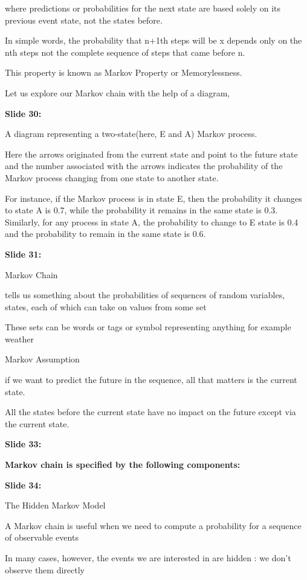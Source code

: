 \documentclass[11pt,a4paper]{article}
\begin{document}
where predictions or probabilities for the next state are based solely on its previous event state, not the states before.

In simple words, the probability that n+1th steps will be x depends only on the nth steps not the complete sequence of steps that came before n.

This property is known as Markov Property or Memorylessness.

Let us explore our Markov chain with the help of a diagram,

\textbf{Slide 30:}

A diagram representing a two-state(here, E and A) Markov process.

Here the arrows originated from the current state and point to the future state and the number associated with the arrows indicates the probability of the Markov process changing from one state to another state.

For instance, if the Markov process is in state E, then the probability it changes to state A is 0.7, while the probability it remains in the same state is 0.3. Similarly, for any process in state A, the probability to change to E state is 0.4 and the probability to remain in the same state is 0.6.

\textbf{Slide 31:}

Markov Chain

tells us something about the probabilities of sequences of random variables, states, each of which can take on values from some set

These sets can be words or tags or symbol representing anything for example weather

Markov Assumption

if we want to predict the future in the sequence, all that matters is the current state.

All the states before the current state have no impact on the future except via the current state.

\textbf{Slide 33:}

\textbf{Markov chain is specified by the following components:} 

\textbf{Slide 34:}

The Hidden Markov Model

A Markov chain is useful when we need to compute a probability for a sequence of observable events

In many cases, however, the events we are interested in are hidden : we don’t observe them directly
\end{document}
